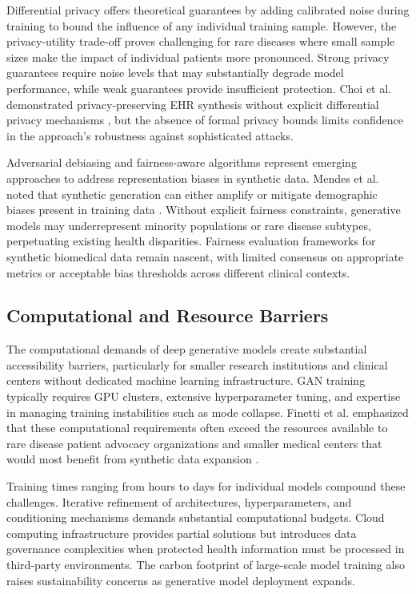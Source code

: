 Differential privacy offers theoretical guarantees by adding calibrated noise during training to bound the influence of any individual training sample. However, the privacy-utility trade-off proves challenging for rare diseases where small sample sizes make the impact of individual patients more pronounced. Strong privacy guarantees require noise levels that may substantially degrade model performance, while weak guarantees provide insufficient protection. Choi et al. demonstrated privacy-preserving EHR synthesis without explicit differential privacy mechanisms \cite{choi2017generating}, but the absence of formal privacy bounds limits confidence in the approach's robustness against sophisticated attacks.

Adversarial debiasing and fairness-aware algorithms represent emerging approaches to address representation biases in synthetic data. Mendes et al. noted that synthetic generation can either amplify or mitigate demographic biases present in training data \cite{mendes2025synthetic}. Without explicit fairness constraints, generative models may underrepresent minority populations or rare disease subtypes, perpetuating existing health disparities. Fairness evaluation frameworks for synthetic biomedical data remain nascent, with limited consensus on appropriate metrics or acceptable bias thresholds across different clinical contexts.

\subsection{Computational and Resource Barriers}

The computational demands of deep generative models create substantial accessibility barriers, particularly for smaller research institutions and clinical centers without dedicated machine learning infrastructure. GAN training typically requires GPU clusters, extensive hyperparameter tuning, and expertise in managing training instabilities such as mode collapse. Finetti et al. emphasized that these computational requirements often exceed the resources available to rare disease patient advocacy organizations and smaller medical centers that would most benefit from synthetic data expansion \cite{finetti2025data}.

Training times ranging from hours to days for individual models compound these challenges. Iterative refinement of architectures, hyperparameters, and conditioning mechanisms demands substantial computational budgets. Cloud computing infrastructure provides partial solutions but introduces data governance complexities when protected health information must be processed in third-party environments. The carbon footprint of large-scale model training also raises sustainability concerns as generative model deployment expands.

